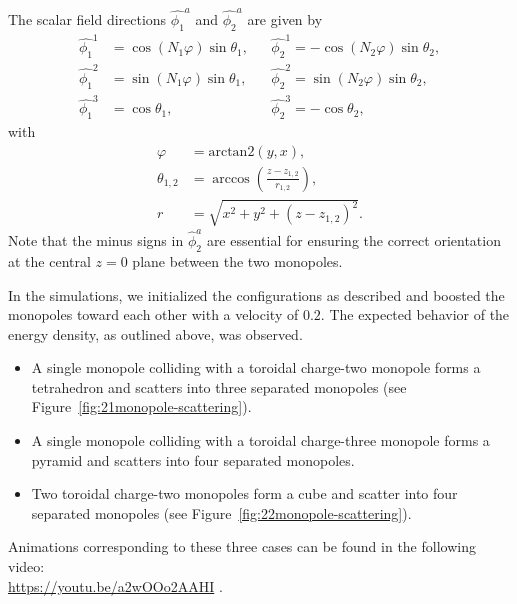 \documentclass[aps, prd, twocolumn, superscriptaddress, preprintnumbers, nofootinbib, longbibliography]{revtex4-1}
\begin{document}
The scalar field directions $\hat{\phi_1}^a$ and $\hat{\phi_2}^a$ are given by
\begin{align}
    \hat{\phi_1}^1 &=\cos(N_1 \varphi)\sin\theta_1, &&\hat{\phi_2}^1=-\cos(N_2 \varphi)\sin\theta_2,\nonumber\\
    \hat{\phi_1}^2 &=\sin(N_1 \varphi)\sin\theta_1, && \hat{\phi_2}^2 =\sin(N_2 \varphi)\sin\theta_2,\nonumber\\
    \hat{\phi_1}^3 &=\cos \theta_1, &&\hat{\phi_2}^3 =-\cos \theta_2,
\end{align}
with
\begin{align}
    \varphi&=\text{arctan2}(y,x),\nonumber\\
    \theta_{1,2}&=\arccos \left(\frac{z-z_{1,2}}{r_{1,2}}\right),\nonumber\\
    r&=\sqrt{x^2+y^2+(z-z_{1,2})^2}.
\end{align}
Note that the minus signs in $\hat{\phi}_2^a$ are essential for ensuring the correct orientation at the central $z=0$ plane between the two monopoles.

In the simulations, we initialized the configurations as described and boosted the monopoles toward each other with a velocity of $0.2$. The expected behavior of the energy density, as outlined above, was observed.
\begin{itemize}
    \item A single monopole colliding with a toroidal charge-two monopole forms a tetrahedron and scatters into three separated monopoles (see Figure~\ref{fig:21monopole-scattering}).
    \item A single monopole colliding with a toroidal charge-three monopole forms a pyramid and scatters into four separated monopoles.
    \item Two toroidal charge-two monopoles form a cube and scatter into four separated monopoles (see Figure~\ref{fig:22monopole-scattering}).
\end{itemize}
Animations corresponding to these three cases can be found in the following video:\\
\url{https://youtu.be/a2wOOo2AAHI} .
\end{document}
